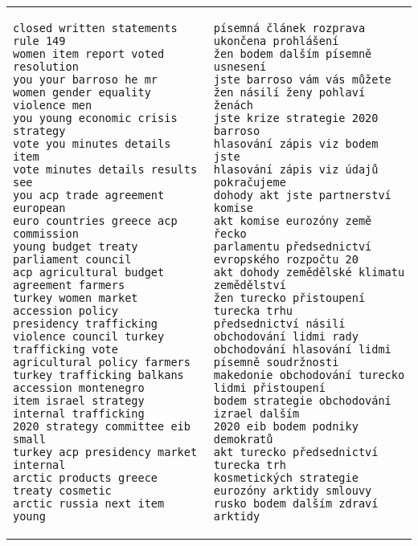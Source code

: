 \documentclass{article} %
\begin{document}
\scriptsize
\begin{tabular}{p{}p{}}
\begin{verbatim}
closed written statements rule 149
women item report voted resolution
you your barroso he mr
women gender equality violence men
you young economic crisis strategy
vote you minutes details item
vote minutes details results see
you acp trade agreement european
euro countries greece acp commission
young budget treaty parliament council
acp agricultural budget agreement farmers
turkey women market accession policy
presidency trafficking violence council turkey
trafficking vote agricultural policy farmers
turkey trafficking balkans accession montenegro
item israel strategy internal trafficking
2020 strategy committee eib small
turkey acp presidency market internal
arctic products greece treaty cosmetic
arctic russia next item young
\end{verbatim}
&
\begin{verbatim}
písemná článek rozprava ukončena prohlášení
žen bodem dalším písemně usnesení
jste barroso vám vás můžete
žen násilí ženy pohlaví ženách
jste krize strategie 2020 barroso
hlasování zápis viz bodem jste
hlasování zápis viz údajů pokračujeme
dohody akt jste partnerství komise
akt komise eurozóny země řecko
parlamentu předsednictví evropského rozpočtu 20
akt dohody zemědělské klimatu zemědělství
žen turecko přistoupení turecka trhu
předsednictví násilí obchodování lidmi rady
obchodování hlasování lidmi písemně soudržnosti
makedonie obchodování turecko lidmi přistoupení
bodem strategie obchodování izrael dalším
2020 eib bodem podniky demokratů
akt turecko předsednictví turecka trh
kosmetických strategie eurozóny arktidy smlouvy
rusko bodem dalším zdraví arktidy
\end{verbatim}
\end{tabular}
\end{document}

